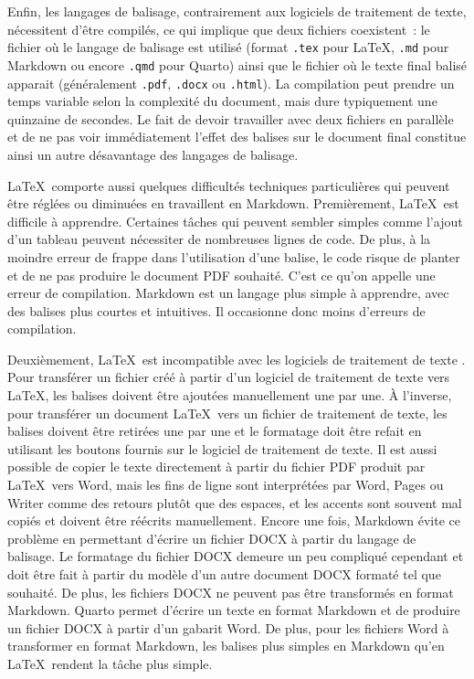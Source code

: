 \documentclass[
  letterpaper,
]{scrbook}
\begin{document}
Enfin, les langages de balisage, contrairement aux logiciels de
traitement de texte, nécessitent d'être compilés, ce qui implique que
deux fichiers coexistent~: le fichier où le langage de balisage est
utilisé (format \texttt{.tex} pour \LaTeX, \texttt{.md} pour Markdown ou
encore \texttt{.qmd} pour Quarto) ainsi que le fichier où le texte final
balisé apparait (généralement \texttt{.pdf}, \texttt{.docx} ou
\texttt{.html}). La compilation peut prendre un temps variable selon la
complexité du document, mais dure typiquement une quinzaine de secondes.
Le fait de devoir travailler avec deux fichiers en parallèle et de ne
pas voir immédiatement l'effet des balises sur le document final
constitue ainsi un autre désavantage des langages de balisage.

\LaTeX~comporte aussi quelques difficultés techniques particulières qui
peuvent être réglées ou diminuées en travaillent en Markdown.
Premièrement, \LaTeX~est difficile à apprendre. Certaines tâches qui
peuvent sembler simples comme l'ajout d'un tableau peuvent nécessiter de
nombreuses lignes de code. De plus, à la moindre erreur de frappe dans
l'utilisation d'une balise, le code risque de planter et de ne pas
produire le document PDF souhaité. C'est ce qu'on appelle une erreur de
compilation. Markdown est un langage plus simple à apprendre, avec des
balises plus courtes et intuitives. Il occasionne donc moins d'erreurs
de compilation.

Deuxièmement, \LaTeX~est incompatible avec les logiciels de traitement
de texte . Pour transférer un fichier créé à partir d'un logiciel de
traitement de texte vers \LaTeX, les balises doivent être ajoutées
manuellement une par une. À l'inverse, pour transférer un document
\LaTeX~vers un fichier de traitement de texte, les balises doivent être
retirées une par une et le formatage doit être refait en utilisant les
boutons fournis sur le logiciel de traitement de texte. Il est aussi
possible de copier le texte directement à partir du fichier PDF produit
par \LaTeX~vers Word, mais les fins de ligne sont interprétées par Word,
Pages ou Writer comme des retours plutôt que des espaces, et les accents
sont souvent mal copiés et doivent être réécrits manuellement. Encore
une fois, Markdown évite ce problème en permettant d'écrire un fichier
DOCX à partir du langage de balisage. Le formatage du fichier DOCX
demeure un peu compliqué cependant et doit être fait à partir du modèle
d'un autre document DOCX formaté tel que souhaité. De plus, les fichiers
DOCX ne peuvent pas être transformés en format Markdown. Quarto permet
d'écrire un texte en format Markdown et de produire un fichier DOCX à
partir d'un gabarit Word. De plus, pour les fichiers Word à transformer
en format Markdown, les balises plus simples en Markdown qu'en
\LaTeX~rendent la tâche plus simple.
\end{document}
